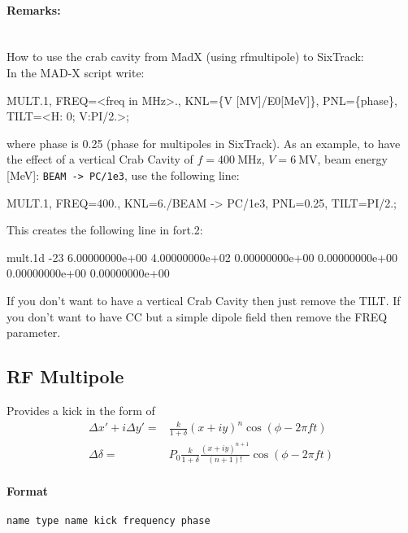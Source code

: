 \paragraph{Remarks:}~\\

\noindent How to use the crab cavity from MadX (using rfmultipole) to SixTrack:\\
\bigskip
\noindent In the MAD-X script write:
\begin{cverbatim}
MULT.1, FREQ=<freq in MHz>., KNL=\{V [MV]/E0[MeV]\}, PNL=\{phase\}, TILT=<H: 0; V:PI/2.>;
\end{cverbatim}
where phase is 0.25 (phase for multipoles in SixTrack).
As an example, to have the effect of a vertical Crab Cavity of $f=400~\mathrm{MHz}$, $V=6~\mathrm{MV}$, beam energy [MeV]: \texttt{BEAM -> PC/1e3}, use the following line:\\
\begin{cverbatim}
MULT.1, FREQ=400., KNL={6./BEAM -> PC/1e3}, PNL={0.25}, TILT=PI/2.;
\end{cverbatim}
This creates the following line in fort.2:
\begin{cverbatim}
mult.1d  -23  6.00000000e+00  4.00000000e+02  0.00000000e+00  0.00000000e+00  0.00000000e+00  0.00000000e+00
\end{cverbatim}
If you don’t want to have a vertical Crab Cavity then just remove the TILT.
If you don’t want to have CC but a simple dipole field then remove the FREQ parameter.

\subsection{RF Multipole}

Provides a kick in the form of
\begin{align}
    \Delta x'+i\Delta y' =& \frac{k}{1+\delta} (x+iy)^n \cos (\phi - 2 \pi f t) \\
    \Delta \delta =& P_0 \frac{k}{1+\delta} \frac{(x+iy)^{n+1}}{(n+1)!} \cos (\phi - 2 \pi f t)
\end{align}

\paragraph{Format} \texttt{name type name kick frequency phase}

